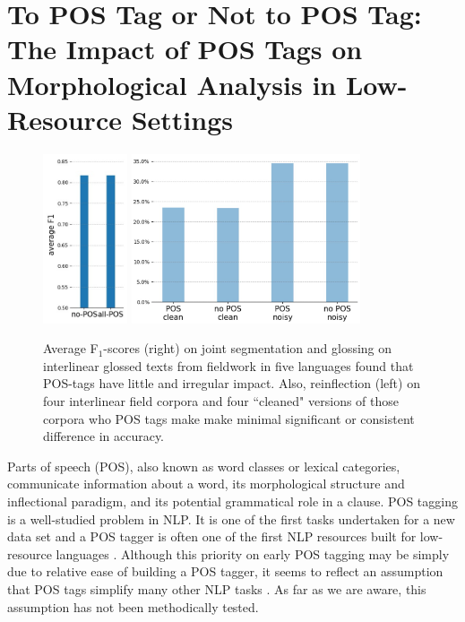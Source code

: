 \chapter{To POS Tag or Not to POS Tag: The Impact of POS Tags on Morphological Analysis in Low-Resource Settings}
\label{chap:POS}
  

\begin{figure}[tb]
    \centering
    \includegraphics[height=5cm]{figs/POSavgSegGlossCropped.jpg}
    \hspace{3cm}
    \includegraphics[height=5cm]{figs/POS-avgReinfl.jpg}
    \caption[Comparison of Morphological Tasks with/out POS tags]{Average  F$_1$-scores (right) on joint segmentation and glossing on interlinear glossed texts from fieldwork in five languages found that POS-tags have little and irregular impact. Also, reinflection (left) on four interlinear field corpora and four ``cleaned" versions of those corpora who POS tags make make minimal significant or consistent difference in accuracy.}
    \label{fig:avgseggls}
\end{figure}

Parts of speech (POS), also known as word classes or lexical categories, communicate information about a word, its morphological structure and inflectional paradigm, and its potential grammatical role in a clause. 
POS tagging is a well-studied problem in NLP. It is one of the first tasks undertaken for a new data set and a POS tagger is often one of the first NLP resources built for low-resource languages
\citep{yarowsky_inducing_2001,cox_probabilistic_2010,de_pauw_resource-light_2012,baldridge_learning_2013,duong_natural_2017,anastasopoulos_computational_2019,millour_unsupervised_2019,eskander_unsupervised_2020}. Although this priority on early POS tagging may be simply due to relative ease of building a POS tagger, it seems to reflect an assumption that POS tags simplify many other NLP tasks \citep{krauwer_basic_2003}. 
As far as we are aware, this assumption has not been methodically tested. 

